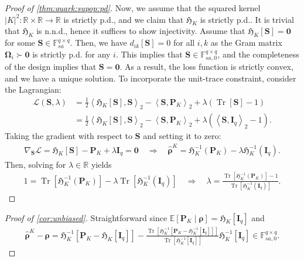\documentclass[noinfoline]{imsart}\setcounter{tocdepth}{2}
\renewcommand{\b}[1]{\mathbb{#1}} %
\newcommand{\m}[1]{\mathbf{#1}} %
\newcommand{\f}[1]{\mathfrak{#1}} %
\renewcommand{\c}[1]{\mathcal{#1}} %
\newcommand{\mb}[1]{\boldsymbol{#1}} %
\newcommand{\tr}[1]{\operatorname{Tr}\left[#1\right]}
\newcommand{\innpr}[2]{{\left\langle {#1},{#2}\right\rangle}} %
\theoremstyle{plain}
\begin{document}
\begin{appendix}
\begin{proof}[Proof of \cref{thm:quark:supop:pd}]
Now, we assume that the squared kernel $|K|^2 : \b{R} \times \b{R} \to \b{R}$ is strictly p.d., and we claim that $\f{H}_{K}$ is strictly p.d.. It is trivial that $\f{H}_{K}$ is n.n.d., hence it suffices to show injectivity. Assume that $\f{H}_{K} [\m{S}] = \m{0}$ for some $\m{S} \in \b{F}_{sa}^{q \times q}$. Then, we have $d_{ik}[\m{S}] = 0$ for all $i, k$ as the Gram matrix $\mb{\Omega}_{i} \succ \m{0}$ is strictly p.d. for any $i$. This implies that $\m{S} \in \b{F}_{sa, 0}^{q \times q}$, and the completeness of the design implies that $\m{S} = \m{0}$. 
As a result, the loss function is strictly convex, and we have a unique solution.
To incorporate the unit-trace constraint, consider the Lagrangian:
\begin{align*} 
    \c{L}(\m{S}, \lambda) &= \frac{1}{2} \innpr{\f{H}_{K}[\m{S}]}{\m{S}}_{2} - \innpr{\m{S}}{\m{P}_{K}}_{2} + \lambda (\tr{\m{S}} - 1) \\
    &= \frac{1}{2} \innpr{\f{H}_{K}[\m{S}]}{\m{S}}_{2} - \innpr{\m{S}}{\m{P}_{K}}_{2} + \lambda (\innpr{\m{S}}{\m{I}_{q}}_{2} - 1).
\end{align*} 
Taking the gradient with respect to $\m{S}$ and setting it to zero: 
\begin{align*} 
    \nabla_{\m{S}} \c{L} = \f{H}_{K}[\m{S}] - \m{P}_K + \lambda \m{I}_q = \m{0} \quad \Longrightarrow \quad \hat{\mb{\rho}}^{K} = \f{H}_K^{-1}(\m{P}_K) - \lambda \f{H}_K^{-1}(\m{I}_{q}).
\end{align*} 
Then, solving for $\lambda \in \b{R}$ yields 
\begin{align*}
    1 = \tr{\f{H}_K^{-1}(\m{P}_K)} - \lambda \tr{\f{H}_K^{-1}(\m{I}_{q})} \quad \Longrightarrow \quad \lambda = \frac{\tr{\f{H}_K^{-1}(\m{P}_K)} - 1}{\tr{\f{H}_K^{-1}(\m{I}_{q})}}.
\end{align*}
\end{proof}


\begin{proof}[Proof of \cref{cor:unbiased}]
Straightforward since $\b{E}[\m{P}_{K} \mid \mb{\rho}] = \f{H}_K[\m{I}_{q}]$ and
\begin{align*}
    \hat{\mb{\rho}}^{K} - \mb{\rho} = \f{H}_K^{-1}[\m{P}_K - \f{H}_K[\m{I}_{q}] ] - \frac{ \tr{\f{H}_K^{-1}[\m{P}_K - \f{H}_K^{-1}[\m{I}_{q}] ]}}{\tr{\f{H}_K^{-1}[\m{I}_{q}]}} \f{H}_K^{-1}[\m{I}_{q}] \in \b{F}_{sa, 0}^{q \times q}.
\end{align*}
\end{proof}



\end{appendix}
\end{document}
